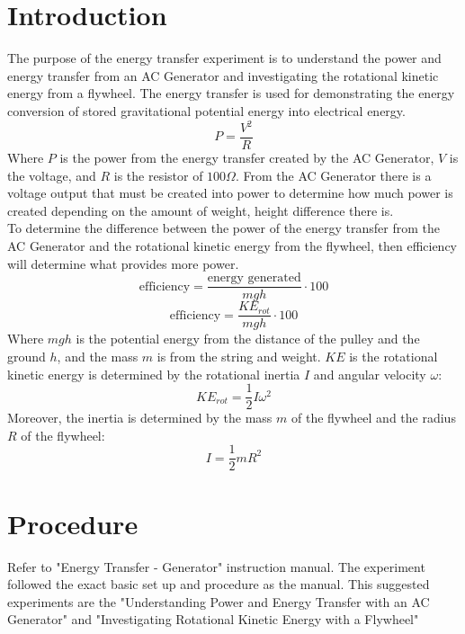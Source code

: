 \documentclass[11pt]{article}
\begin{document}
\section*{Introduction}
The purpose of the energy transfer experiment is to understand the power and energy transfer from an AC Generator and investigating the rotational kinetic energy from a flywheel. The energy transfer is used for demonstrating the energy conversion of stored gravitational potential energy into electrical energy. 
\begin{equation}
    P=\frac{V^2}{R}
\end{equation}
Where $P$ is the power from the energy transfer created by the AC Generator, $V$ is the voltage, and $R$ is the resistor of $100\Omega$. From the AC Generator there is a voltage output that must be created into power to determine how much power is created depending on the amount of weight, height difference there is.\\ To determine the difference between the power of the energy transfer from the AC Generator and the rotational kinetic energy from the flywheel, then efficiency will determine what provides more power. 
\begin{equation}
    \text{efficiency}=\frac{\text{energy generated}}{mgh}\cdot 100
\end{equation}
\begin{equation}
    \text{efficiency}=\frac{KE_{rot}}{mgh}\cdot 100
\end{equation}
Where $mgh$ is the potential energy from the distance of the pulley and the ground $h$, and the mass $m$ is from the string and weight. $KE$ is the rotational kinetic energy is determined by the rotational inertia $I$ and angular velocity $\omega$:
\begin{equation}
    KE_{rot}=\frac{1}{2}I\omega^2
\end{equation}
Moreover, the inertia is determined by the mass $m$ of the flywheel and the radius $R$ of the flywheel:
\begin{equation}
    I=\frac{1}{2}mR^2
\end{equation}


\section*{Procedure}
Refer to "Energy Transfer - Generator" instruction manual. The experiment followed the exact basic set up and procedure as the manual. This suggested experiments are the "Understanding Power and Energy Transfer with an AC Generator" and "Investigating Rotational Kinetic Energy with a Flywheel"
\end{document}
